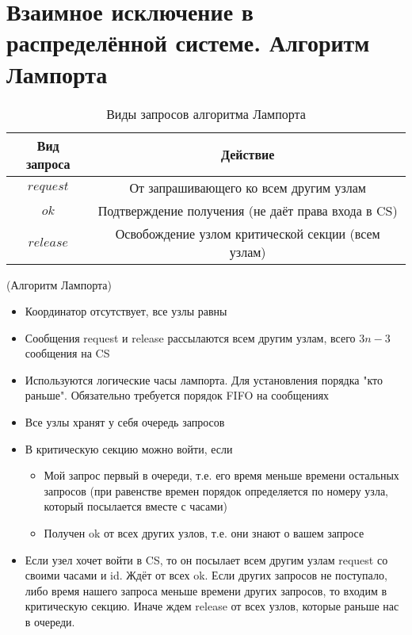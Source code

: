 \section{Взаимное исключение в распределённой системе. Алгоритм Лампорта}

\begin{table}[!ht]
    \centering
    \begin{tabular}{|c|c|} \hline
    Вид запроса & Действие \\ \hline
    $request$ & От запрашивающего ко всем другим узлам\\ \hline
    $ok$ & Подтверждение получения (не даёт права входа в CS) \\ \hline
    $release$ & Освобождение узлом критической секции (всем узлам) \\ \hline
    \end{tabular}
    \caption{Виды запросов алгоритма Лампорта}
\end{table}

\begin{algorithm}(Алгоритм Лампорта)
\begin{itemize}
    \item Координатор отсутствует, все узлы равны
    \item Сообщения request и release рассылаются всем другим узлам, всего $3n-3$ сообщения на CS
    \item Используются логические часы лампорта.
        Для установления порядка "кто раньше".
        Обязательно требуется порядок FIFO на сообщениях
    \item Все узлы хранят у себя очередь запросов
    \item В критическую секцию можно войти, если
        \begin{itemize}
            \item Мой запрос первый в очереди, т.е. его время меньше времени остальных запросов
                (при равенстве времен порядок определяется по номеру узла, который посылается вместе с часами)
            \item Получен ok от всех других узлов, т.е. они знают о вашем запросе
        \end{itemize}
    \item Если узел хочет войти в CS, то он посылает всем другим узлам request со своими часами и id.
        Ждёт от всех ok. Если других запросов не поступало, либо время нашего запроса меньше времени других запросов, то
        входим в критическую секцию. Иначе ждем release от всех узлов, которые раньше нас в очереди.
\end{itemize}
\end{algorithm}

